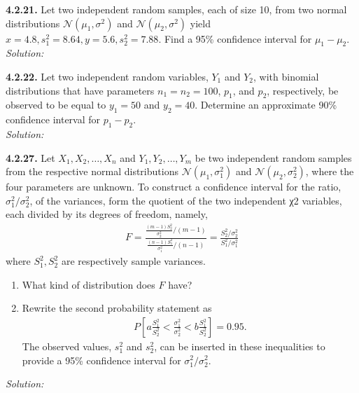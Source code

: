 \documentclass{book}
\theoremstyle{definition}
\newcommand{\N}{\mathcal{N}}
\newcommand{\f}[2]{\frac{#1}{#2}}
\newcommand{\lb}{\left[}
\newcommand{\rb}{\right]}
\begin{document}
 
\newpage
\noindent\textbf{4.2.21.} Let two independent random samples, each of size 10, from two normal
distributions $\N(\mu_1, \sigma^2)$ and $\N(\mu_2, \sigma^2)$ yield $x = 4.8, s^2_1 = 8.64, y = 5.6, s^2_2 = 7.88$. Find a 95\% confidence interval for $\mu_1 − \mu_2$.\\

\noindent \textit{Solution:} 


\newpage
\noindent\textbf{4.2.22.} Let two independent random variables, $Y_1$ and $Y_2$, with binomial distributions that have parameters $n_1 = n_2 = 100$, $p_1$, and $p_2$, respectively, be observed
to be equal to $y_1 = 50$ and $y_2 = 40$. Determine an approximate 90\% confidence
interval for $p_1 − p_2$.\\



\noindent \textit{Solution:} 



\newpage
\noindent\textbf{4.2.27.} Let $X_1, X_2,\dots,X_n$ and $Y_1, Y_2,\dots,Y_m$ be two independent random samples
from the respective normal distributions $\N(\mu_1, \sigma^2_1)$ and $\N(\mu_2, \sigma^2_2)$, where the four
parameters are unknown. To construct a confidence interval for the ratio, $\sigma^2_1/\sigma^2_2$, of
the variances, form the quotient of the two independent χ2 variables, each divided
by its degrees of freedom, namely,
\begin{align}
F = \f{\f{(m-1)S_2^2}{\sigma^2_2}/(m-1)}{\f{(n-1)S_1^2}{\sigma^2_1}/(n-1)} = \f{S_2^2/\sigma_2^2}{S_1^2/\sigma_1^2}
\end{align}
where $S_1^2, S_2^2$ are respectively sample variances. 

\begin{enumerate}
	\item What kind of distribution does $F$ have?
	\item Rewrite the second probability statement as
	\begin{align}
	P \lb a\f{S_1^2}{S_2^2} < \f{\sigma_1^2}{\sigma_2^2} < b \f{S_1^2}{S^2_2} \rb = 0.95.
	\end{align}
	The observed values, $s^2_1$ and $s_2^2$, can be inserted in these inequalities to provide
	a 95\% confidence interval for $\sigma^2_1/σ^2_2$. 
\end{enumerate}





\noindent \textit{Solution:} 
\end{document}
